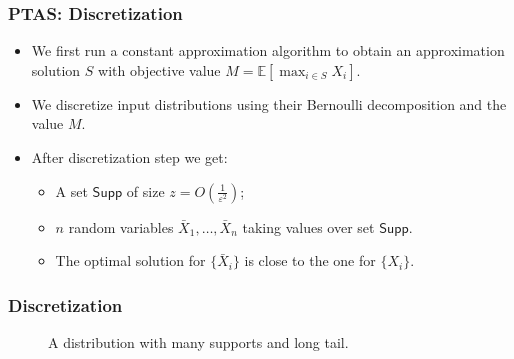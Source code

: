 \documentclass{beamer}
\newcommand{\Exp}{{\mathbb{E}}}
\begin{document}
\begin{frame}
    \frametitle{PTAS: Discretization}
    \begin{itemize}
        \item    We first run a constant approximation algorithm to obtain an approximation solution $S$ with objective value $M = \Exp[\max_{i\in S} X_i]$.\\
        \item    We discretize input distributions using their Bernoulli decomposition and the value $M$.\\
        \item    After discretization step we get:
    \begin{itemize}
        \item A set $\mathsf{Supp}$ of size $z = O(\frac{1}{\varepsilon^2})$;
        \item $n$ random variables $\bar X_1, \ldots, \bar X_n$ taking values over set $\mathsf{Supp}$.
        \item The optimal solution for $\{\bar X_i\}$ is close to the one for $\{X_i\}$.
    \end{itemize}
    \end{itemize}

\end{frame}
\begin{frame}
    \frametitle{Discretization}
    \begin{figure}
    \caption{A distribution with many supports and long tail.}
\end{figure}
\end{frame}
\end{document}
